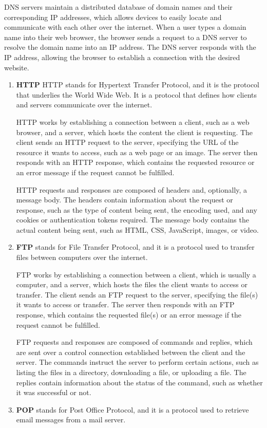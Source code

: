 \documentclass[11pt]{article}
\begin{document}
DNS servers maintain a distributed database of domain names and their corresponding IP addresses, which allows devices to easily locate and communicate with each other over the internet. When a user types a domain name into their web browser, the browser sends a request to a DNS server to resolve the domain name into an IP address. The DNS server responds with the IP address, allowing the browser to establish a connection with the desired website.
\begin{enumerate}
    \item \textbf{HTTP}
    HTTP stands for Hypertext Transfer Protocol, and it is the protocol that underlies the World Wide Web. It is a protocol that defines how clients and servers communicate over the internet.

    HTTP works by establishing a connection between a client, such as a web browser, and a server, which hosts the content the client is requesting. The client sends an HTTP request to the server, specifying the URL of the resource it wants to access, such as a web page or an image. The server then responds with an HTTP response, which contains the requested resource or an error message if the request cannot be fulfilled.

    HTTP requests and responses are composed of headers and, optionally, a message body. The headers contain information about the request or response, such as the type of content being sent, the encoding used, and any cookies or authentication tokens required. The message body contains the actual content being sent, such as HTML, CSS, JavaScript, images, or video.

    \item \textbf{FTP} stands for File Transfer Protocol, and it is a protocol used to transfer files between computers over the internet.

    FTP works by establishing a connection between a client, which is usually a computer, and a server, which hosts the files the client wants to access or transfer. The client sends an FTP request to the server, specifying the file(s) it wants to access or transfer. The server then responds with an FTP response, which contains the requested file(s) or an error message if the request cannot be fulfilled.
    
    FTP requests and responses are composed of commands and replies, which are sent over a control connection established between the client and the server. The commands instruct the server to perform certain actions, such as listing the files in a directory, downloading a file, or uploading a file. The replies contain information about the status of the command, such as whether it was successful or not.
    \item \textbf{POP} stands for Post Office Protocol, and it is a protocol used to retrieve email messages from a mail server.


\end{enumerate}
\end{document}
